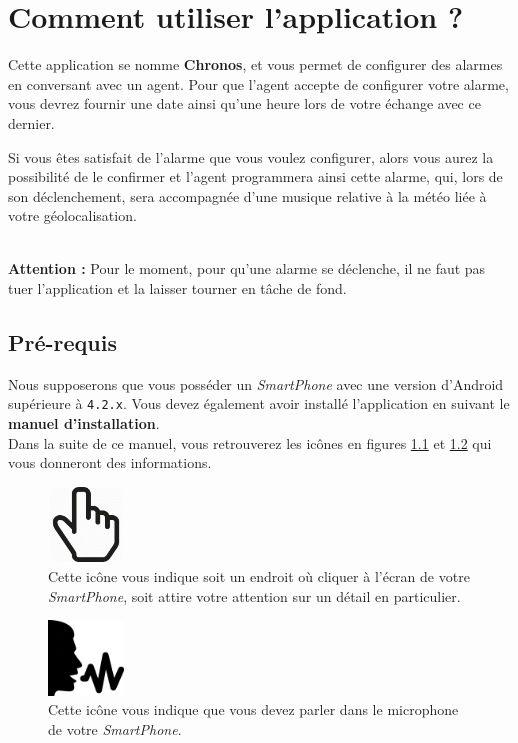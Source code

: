 \chapter{Comment utiliser l'application ?}

Cette application se nomme \textbf{Chronos}, et vous permet de configurer des alarmes en conversant avec un agent. Pour que l'agent accepte de configurer votre alarme, vous devrez fournir une date ainsi qu'une heure lors de votre échange avec ce dernier. 

Si vous êtes satisfait de l'alarme que vous voulez configurer, alors vous
aurez la possibilité de le confirmer et l'agent programmera ainsi cette alarme, qui, lors de son déclenchement, sera accompagnée d'une musique relative à la météo liée à votre géolocalisation. 

~\\\indent \textbf{Attention :} Pour le moment, pour qu'une alarme se déclenche, il ne faut pas tuer l'application et la laisser tourner en tâche de fond.

\section{Pré-requis}
Nous supposerons que vous posséder un \emph{SmartPhone} avec une version d'Android supérieure à \texttt{4.2.x}. Vous devez également avoir installé l'application
en suivant le \textbf{manuel d'installation}.\\

Dans la suite de ce manuel, vous retrouverez les icônes en figures \ref{hand} et \ref{voice} qui vous donneront des informations.

\begin{figure}[H]
  \centering
  \includegraphics[width=2cm]{images/hand.png}
  \caption{Cette icône vous indique soit un endroit où cliquer à l'écran de votre \emph{SmartPhone}, soit attire votre attention sur un détail en particulier.}
  \label{hand}
\end{figure}

\begin{figure}[H]
  \centering
  \includegraphics[width=2cm]{images/voice.png}
  \caption{Cette icône vous indique que vous devez parler dans le microphone de votre \emph{SmartPhone}.}
  \label{voice}
\end{figure}


